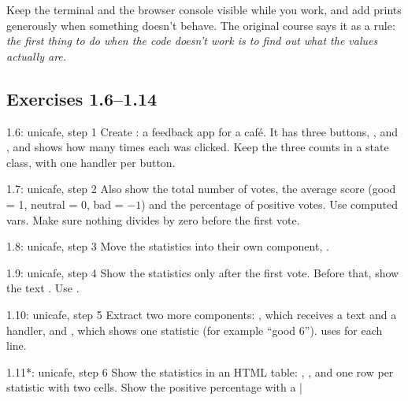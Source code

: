 Keep the terminal and the browser console visible while you work, and add prints generously when something doesn't behave. The original course says it as a rule: \emph{the first thing to do when the code doesn't work is to find out what the values actually are.}

\subsection{Exercises 1.6--1.14}

\begin{exercise}{1.6: unicafe, step 1}
Create : a feedback app for a café. It has three buttons, ,  and , and shows how many times each was clicked. Keep the three counts in a state class, with one handler per button.
\end{exercise}

\begin{exercise}{1.7: unicafe, step 2}
Also show the total number of votes, the average score (good = 1, neutral = 0, bad = $-1$) and the percentage of positive votes. Use computed vars. Make sure nothing divides by zero before the first vote.
\end{exercise}

\begin{exercise}{1.8: unicafe, step 3}
Move the statistics into their own component, .
\end{exercise}

\begin{exercise}{1.9: unicafe, step 4}
Show the statistics only after the first vote. Before that, show the text . Use .
\end{exercise}

\begin{exercise}{1.10: unicafe, step 5}
Extract two more components: , which receives a text and a handler, and , which shows one statistic (for example ``good 6'').  uses  for each line.
\end{exercise}

\begin{exercise}{1.11*: unicafe, step 6}
Show the statistics in an HTML table: , , and one  row per statistic with two  cells. Show the positive percentage with a \icode|%
\end{exercise}

